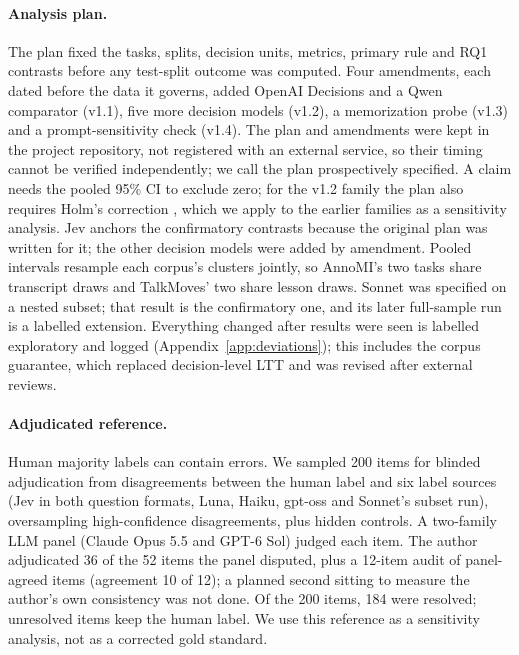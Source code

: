\paragraph{Analysis plan.} The plan fixed the tasks, splits, decision units, metrics, primary rule and RQ1 contrasts before
any test-split outcome was computed. Four amendments, each dated before the data it governs, added OpenAI Decisions and a
Qwen comparator (v1.1), five more decision models (v1.2), a memorization probe (v1.3) and a prompt-sensitivity check (v1.4).
The plan and amendments were kept in the project repository, not registered with an external service, so their timing
cannot be verified independently; we call the plan prospectively specified. A claim needs the pooled 95\% CI to exclude
zero; for the v1.2 family the plan also requires Holm's correction \citep{holm1979simple}, which we apply to the earlier
families as a sensitivity analysis. Jev anchors the confirmatory contrasts because the original plan was written for it;
the other decision models were added by amendment. Pooled intervals resample each corpus's clusters jointly, so AnnoMI's two
tasks share transcript draws and TalkMoves' two share lesson draws. Sonnet was specified on a nested subset; that result is the
confirmatory one, and its later full-sample run is a labelled extension. Everything changed after results were seen is
labelled exploratory and logged (Appendix~\ref{app:deviations}); this includes the corpus guarantee, which replaced
decision-level LTT and was revised after external reviews.

\paragraph{Adjudicated reference.} Human majority labels can contain errors. We sampled 200 items for blinded adjudication from
disagreements between the human label and six label sources (Jev in both question formats, Luna, Haiku, gpt-oss and Sonnet's
subset run), oversampling high-confidence disagreements, plus hidden controls. A two-family LLM panel (Claude Opus 5.5
and GPT-6 Sol) judged each item. The author adjudicated 36 of the 52 items the panel disputed, plus a 12-item audit of panel-agreed items (agreement 10 of 12); a planned
second sitting to measure the author's own consistency was not done. Of the 200 items, 184 were resolved; unresolved items
keep the human label. We use this reference as a sensitivity analysis, not as a corrected gold standard.
